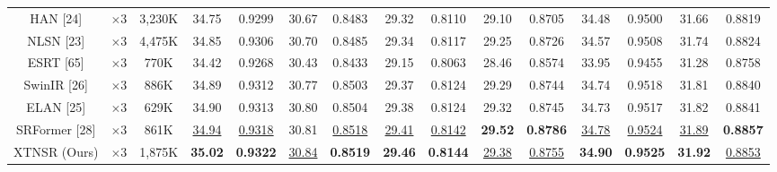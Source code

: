 \documentclass[twocolumn]{svjour3}          %
\begin{document}
\begin{table}
\begin{tabular}{|c|c|c|cc|cc|cc|cc|cc|cc|}
HAN [24] & $\times3$&3,230K& \multicolumn{1}{c|}{34.75} & 0.9299 & \multicolumn{1}{c|}{30.67} & 0.8483 &\multicolumn{1}{c|}{29.32} & 0.8110 & \multicolumn{1}{c|}{29.10} & 0.8705 & \multicolumn{1}{c|}{34.48} & 0.9500
&\multicolumn{1}{c|}{31.66} &0.8819\\

NLSN [23] & $\times3$ &4,475K& \multicolumn{1}{c|}{34.85} & 0.9306& \multicolumn{1}{c|}{30.70} &0.8485 &\multicolumn{1}{c|}{29.34} & 0.8117& \multicolumn{1}{c|}{29.25} & 0.8726& \multicolumn{1}{c|}{34.57} & 0.9508
&\multicolumn{1}{c|}{31.74} &0.8824\\

ESRT [65] & $\times 3$ &770K& \multicolumn{1}{c|}{34.42} & 0.9268 & \multicolumn{1}{c|}{30.43} & 0.8433 & \multicolumn{1}{c|}{29.15} & 0.8063 & \multicolumn{1}{c|}{28.46} &0.8574 & \multicolumn{1}{c|}{33.95} & 0.9455
&\multicolumn{1}{c|}{31.28} & 0.8758\\

SwinIR [26] & $\times3$ &886K& \multicolumn{1}{c|}{34.89} & {0.9312} & \multicolumn{1}{c|}{30.77} &{0.8503} & \multicolumn{1}{c|}{29.37} & {0.8124} & {29.29} & {0.8744}& \multicolumn{1}{c|}{34.74} &{0.9518} &\multicolumn{1}{c|}{31.81} & {0.8840}\\

ELAN [25] & $\times 3$ &629K& \multicolumn{1}{c|}{34.90} & 0.9313 & \multicolumn{1}{c|}{30.80} & 0.8504 & \multicolumn{1}{c|}{29.38} & 0.8124 & \multicolumn{1}{c|}{29.32} &0.8745 & \multicolumn{1}{c|}{34.73} & 0.9517
&\multicolumn{1}{c|}{31.82} & 0.8841\\

SRFormer [28] & $\times 3$ &861K& \multicolumn{1}{c|}{\color{blue}\underline{34.94}} & {\color{blue}\underline{0.9318}} & \multicolumn{1}{c|}{30.81} &{\color{blue}\underline{ 0.8518}} & \multicolumn{1}{c|}{\color{blue}\underline{29.41}} & {\color{blue}\underline{0.8142}} & \multicolumn{1}{c|}{\color{red}\textbf{29.52}} & {\color{red}\textbf{0.8786}} & \multicolumn{1}{c|}{\color{blue}\underline{34.78}} &{\color{blue}\underline{0.9524}} &\multicolumn{1}{c|}{\color{blue}\underline{31.89}} & {\color{red}\textbf{ 0.8857}}\\

XTNSR (Ours) & $\times 3$ &1,875K& \multicolumn{1}{c|}{\color{red}\textbf{35.02}} &{\color{red}\textbf{0.9322}} & \multicolumn{1}{c|}{\color{blue}\underline{30.84} } &{\color{red}\textbf{ 0.8519}} & \multicolumn{1}{c|}{\color{red}\textbf{29.46}} &{\color{red}\textbf{0.8144}}& \multicolumn{1}{c|}{\color{blue}\underline{29.38}} &{\color{blue}\underline{0.8755}}& \multicolumn{1}{c|}{\color{red}\textbf{34.90}} &{\color{red}\textbf{0.9525}} &\multicolumn{1}{c|}{\color{red}\textbf{31.92}} & {\color{blue}\underline{0.8853}}\\


\end{tabular}
\end{table}
\end{document}
